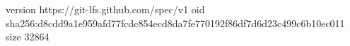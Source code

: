 version https://git-lfs.github.com/spec/v1
oid sha256:d8cdd9a1e959afd77fcdc854ecd8da7fe770192f86df7d6d23c499c6b10ec011
size 32864
